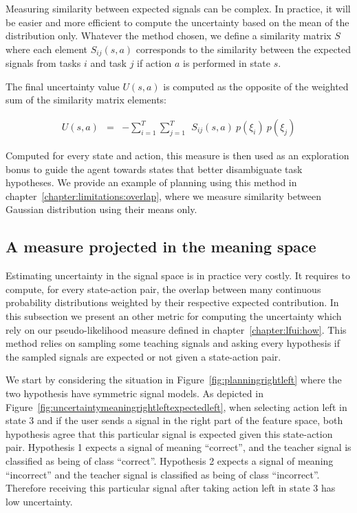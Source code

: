 Measuring similarity between expected signals can be complex. In practice, it will be easier and more efficient to compute the uncertainty based on the mean of the distribution only. Whatever the method chosen, we define a similarity matrix $S$ where each element $S_{ij}(s,a)$ corresponds to the similarity between the expected signals from tasks $i$ and task $j$ if action $a$ is performed in state $s$.


The final uncertainty value $U(s,a)$ is computed as the opposite of the weighted sum of the similarity matrix elements:

\begin{eqnarray}
U(s,a) &=& - \sum_{i = 1}^{T} \sum_{j = 1}^{T} ~~ S_{ij}(s,a) ~ p(\xi_i) ~ p(\xi_j)
\end{eqnarray}


Computed for every state and action, this measure is then used as an exploration bonus to guide the agent towards states that better disambiguate task hypotheses. We provide an example of planning using this method in chapter~\ref{chapter:limitations:overlap}, where we measure similarity between Gaussian distribution using their means only.

\subsection{A measure projected in the meaning space}
\label{chapter:planning:uncertiantyprojected}

Estimating uncertainty in the signal space is in practice very costly. It requires to compute, for every state-action pair, the overlap between many continuous probability distributions weighted by their respective expected contribution. In this subsection we present an other metric for computing the uncertainty which rely on our pseudo-likelihood measure defined in chapter~\ref{chapter:lfui:how}. This method relies on sampling some teaching signals and asking every hypothesis if the sampled signals are expected or not given a state-action pair.

We start by considering the situation in Figure~\ref{fig:planningrightleft} where the two hypothesis have symmetric signal models. As depicted in Figure~\ref{fig:uncertaintymeaningrightleftexpectedleft}, when selecting action left in state 3 and if the user sends a signal in the right part of the feature space, both hypothesis agree that this particular signal is expected given this state-action pair. Hypothesis 1 expects a signal of meaning ``correct'', and the teacher signal is classified as being of class ``correct''. Hypothesis 2 expects a signal of meaning ``incorrect'' and the teacher signal is classified as being of class ``incorrect''. Therefore receiving this particular signal after taking action left in state 3 has low uncertainty.

